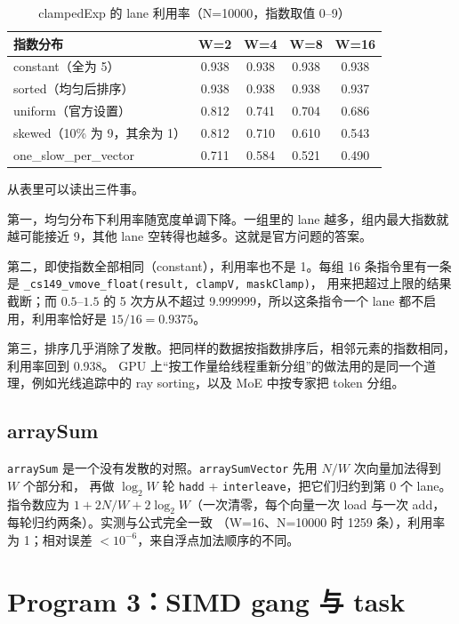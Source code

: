 \documentclass[11pt,a4paper]{ctexart}
\begin{document}
\begin{table}[H]
\centering
\caption{clampedExp 的 lane 利用率（N=10000，指数取值 0--9）}
\label{tab:prog2}
\begin{tabular}{lcccc}
\toprule
指数分布 & W=2 & W=4 & W=8 & W=16 \\
\midrule
constant（全为 5） & 0.938 & 0.938 & 0.938 & 0.938 \\
sorted（均匀后排序） & 0.938 & 0.938 & 0.938 & 0.937 \\
uniform（官方设置） & 0.812 & 0.741 & 0.704 & 0.686 \\
skewed（10\% 为 9，其余为 1） & 0.812 & 0.710 & 0.610 & 0.543 \\
one\_slow\_per\_vector & 0.711 & 0.584 & 0.521 & 0.490 \\
\bottomrule
\end{tabular}
\end{table}

从表里可以读出三件事。

第一，均匀分布下利用率随宽度单调下降。一组里的 lane 越多，组内最大指数就越可能接近 9，其他 lane 空转得也越多。这就是官方问题的答案。

第二，即使指数全部相同（constant），利用率也不是 1。每组 16 条指令里有一条是 \texttt{\_cs149\_vmove\_float(result, clampV, maskClamp)}，
用来把超过上限的结果截断；而 $0.5$--$1.5$ 的 5 次方从不超过 9.999999，所以这条指令一个 lane 都不启用，利用率恰好是 $15/16 = 0.9375$。

第三，排序几乎消除了发散。把同样的数据按指数排序后，相邻元素的指数相同，利用率回到 0.938。
GPU 上``按工作量给线程重新分组''的做法用的是同一个道理，例如光线追踪中的 ray sorting，以及 MoE 中按专家把 token 分组。

\subsection{arraySum}

\texttt{arraySum} 是一个没有发散的对照。\texttt{arraySumVector} 先用 $N/W$ 次向量加法得到 $W$ 个部分和，
再做 $\log_2 W$ 轮 \texttt{hadd} + \texttt{interleave}，把它们归约到第 0 个 lane。
指令数应为 $1 + 2N/W + 2\log_2 W$（一次清零，每个向量一次 load 与一次 add，每轮归约两条）。实测与公式完全一致
（W=16、N=10000 时 1259 条），利用率为 1；相对误差 $<10^{-6}$，来自浮点加法顺序的不同。

\section{Program 3：SIMD gang 与 task}
\label{sec:prog3}
\end{document}
